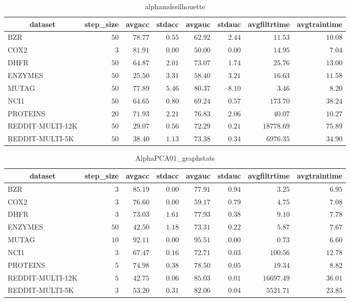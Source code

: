 \begin{table}[!tbp]
\caption{alphamdssilhouette\label{alphamdssilhouette}} 
{\centering
\begin{tabular}{lrrrrrrr}
\hline\hline
\multicolumn{1}{c}{dataset}&\multicolumn{1}{c}{step_size}&\multicolumn{1}{c}{avgacc}&\multicolumn{1}{c}{stdacc}&\multicolumn{1}{c}{avgauc}&\multicolumn{1}{c}{stdauc}&\multicolumn{1}{c}{avgfiltrtime}&\multicolumn{1}{c}{avgtraintime}\tabularnewline
\hline
BZR&$50$&$78.77$&$0.55$&$62.92$&$2.44$&$   11.53$&$10.08$\tabularnewline
COX2&$ 3$&$81.91$&$0.00$&$50.00$&$0.00$&$   14.95$&$ 7.04$\tabularnewline
DHFR&$50$&$64.87$&$2.01$&$73.07$&$1.74$&$   25.76$&$13.00$\tabularnewline
ENZYMES&$50$&$25.50$&$3.31$&$58.40$&$3.21$&$   16.63$&$11.58$\tabularnewline
MUTAG&$50$&$77.89$&$5.46$&$80.37$&$8.10$&$    3.46$&$ 8.20$\tabularnewline
NCI1&$50$&$64.65$&$0.80$&$69.24$&$0.57$&$  173.70$&$38.24$\tabularnewline
PROTEINS&$20$&$71.93$&$2.21$&$76.83$&$2.06$&$   40.07$&$10.27$\tabularnewline
REDDIT-MULTI-12K&$50$&$29.07$&$0.56$&$72.29$&$0.21$&$18778.69$&$75.89$\tabularnewline
REDDIT-MULTI-5K&$50$&$38.40$&$1.13$&$73.38$&$0.34$&$ 6976.35$&$34.90$\tabularnewline
\hline
\end{tabular}}
\end{table}
\begin{table}[!tbp]
\caption{AlphaPCA01_graphstats\label{AlphaPCA01_graphstats}} 
{\centering
\begin{tabular}{lrrrrrrr}
\hline\hline
\multicolumn{1}{c}{dataset}&\multicolumn{1}{c}{step_size}&\multicolumn{1}{c}{avgacc}&\multicolumn{1}{c}{stdacc}&\multicolumn{1}{c}{avgauc}&\multicolumn{1}{c}{stdauc}&\multicolumn{1}{c}{avgfiltrtime}&\multicolumn{1}{c}{avgtraintime}\tabularnewline
\hline
BZR&$ 3$&$85.19$&$0.00$&$77.91$&$0.94$&$    3.25$&$ 6.95$\tabularnewline
COX2&$ 3$&$76.60$&$0.00$&$59.17$&$0.79$&$    4.75$&$ 7.08$\tabularnewline
DHFR&$ 3$&$73.03$&$1.61$&$77.93$&$0.38$&$    9.10$&$ 7.78$\tabularnewline
ENZYMES&$50$&$42.50$&$1.18$&$73.31$&$0.22$&$    5.87$&$ 7.67$\tabularnewline
MUTAG&$10$&$92.11$&$0.00$&$95.51$&$0.00$&$    0.73$&$ 6.60$\tabularnewline
NCI1&$ 3$&$67.47$&$0.16$&$72.71$&$0.03$&$  100.56$&$12.78$\tabularnewline
PROTEINS&$ 5$&$74.98$&$0.38$&$78.50$&$0.05$&$   19.34$&$ 8.82$\tabularnewline
REDDIT-MULTI-12K&$ 5$&$42.75$&$0.06$&$85.03$&$0.01$&$16697.49$&$36.01$\tabularnewline
REDDIT-MULTI-5K&$ 3$&$53.20$&$0.31$&$82.06$&$0.04$&$ 5521.71$&$23.85$\tabularnewline
\hline
\end{tabular}}
\end{table}
